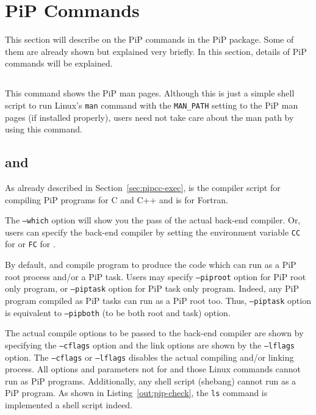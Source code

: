 
\section{PiP Commands}

This section will describe on the PiP commands in the PiP
package. Some of them are already shown but explained very briefly. In
this section, details of PiP commands will be explained.

\subsection{}\label{sec:pip-man}

This command shows the PiP man pages. Although this is just a simple
shell script to run Linux's {\tt man} command with the {\tt MAN_PATH}
setting to the PiP man pages (if installed properly), users need not take 
care about the man path by using this command.

\subsection{ and }

As already described in Section~\ref{sec:pipcc-exec}, 
is the compiler script for compiling PiP programs for C and C++ and
 is for Fortran.

The {\tt --which} option will show you the pass of the actual back-end
compiler. Or, users can specify the back-end compiler by setting the 
environment variable {\tt CC} for  or {\tt FC} for
.

By default,  and  compile program to
produce the code which can run as a PiP root process and/or a PiP
task. Users may specify {\tt --piproot} option for PiP root only
program, or {\tt --piptask} option for PiP task only program. Indeed,
any PiP program compiled as PiP tasks can run as a PiP root too. Thus,
{\tt --piptask} option is equivalent to {\tt --pipboth} (to
be both root and task) option.

The actual compile options to be passed to the back-end compiler are
shown by 
specifying the {\tt --cflags} option and the link options are shown by
the {\tt --lflags} option. The {\tt --cflags} or {\tt --lflags}
disables the actual compiling and/or linking process.
All options and parameters not for  and those Linux
commands cannot run as PiP 
programs. Additionally, any shell script (shebang) cannot run as a PiP
program. As shown in Listing~\ref{out:pip-check}, the {\tt ls} command
is implemented a shell script indeed.

